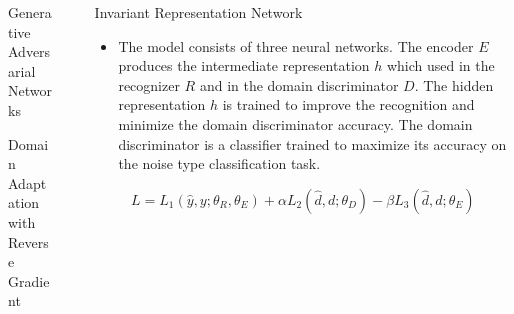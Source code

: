 \documentclass[final]{beamer}
\newlength{\sepwid}
\newlength{\onecolwid}
\newlength{\twocolwid}
\begin{document}
\begin{frame}[t]
\begin{columns}[t]
\begin{column}{\onecolwid}
\begin{block}{Generative Adversarial Networks}
\begin{block}{Domain Adaptation with Reverse Gradient}
\begin{itemize}
        \end{itemize}
        
    \end{block}
\end{block}

\end{column} %

\begin{column}{\sepwid}\end{column} %

\begin{column}{\twocolwid}

    \begin{columns}[t]

        \begin{column}{\onecolwid} %
            \begin{block}{{\Large Invariant Representation Network}}
                \begin{itemize}
                    \item The model consists of three neural networks. The encoder $E$ produces
                        the intermediate representation $h$ which used in the recognizer $R$ and 
                        in the domain discriminator $D$. The hidden representation $h$ is trained to improve
                        the recognition and minimize the domain discriminator accuracy. The domain discriminator
                        is a classifier trained to maximize its accuracy on the noise type
                        classification task.
                \end{itemize}
                \begin{equation*}
                    L = L_1(\hat{y}, y; \theta_R, \theta_E) + 
                    \alpha L_2(\hat{d}, d; \theta_D) -
                    \beta L_3(\hat{d}, d; \theta_E)
                \end{equation*}


\end{block}
\end{column}
\end{columns}
\end{column}
\end{columns}
\end{frame}
\end{document}
